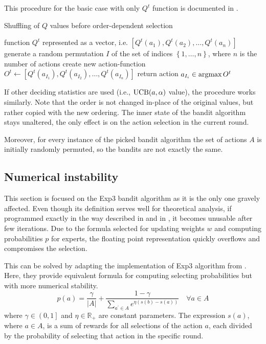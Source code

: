 \documentclass[../main.tex]{subfiles}
\begin{document}
This procedure for the basic case with only $Q^t$ function is documented in .
\begin{algorithm}[ht]
    \caption{Shuffling of $Q$ values before order-dependent selection}
    \label{new:bandit:stochasticity:shuffle}
    \begin{algorithmic}[1]
        \Require function $Q^t$ represented as a vector, i.e. $[Q^t(a_1), Q^t(a_2), \dots, Q^t(a_n)]$
        \State generate a random permutation $I$ of the set of indices $\left\{1, \dots, n\right\}$, where $n$ is the number of actions
        \State create new action-function $O^t \leftarrow [Q^t(a_{I_1}), Q^t(a_{I_2}), \dots, Q^t(a_{I_n})]$
        \State return action $a_{I_i} \in \operatorname*{argmax} O^t$
    \end{algorithmic}
\end{algorithm}
If other deciding statistics are used (i.e., $\text{UCB}(a, \alpha)$ value), the procedure works similarly.
Note that the order is not changed in-place of the original values, but rather copied with the new ordering.
The inner state of the bandit algorithm stays unaltered, the only effect is on the action selection in the current round.

Moreover, for every instance of the picked bandit algorithm the set of actions $A$ is initially randomly permuted, so the bandits are not exactly the same.

\subsection{Numerical instability}\label{new:bandit:instability}
This section is focused on the Exp3 bandit algorithm as it is the only one gravely affected.
Even though its definition serves well for theoretical analysis, if programmed exactly in the way described in  and in \cite{bandits}, it becomes unusable after few iterations.
Due to the formula selected for updating weights $w$ and computing probabilities $p$ for experts, the floating point representation quickly overflows and compromises the selection.

This can be solved by adapting the implementation of Exp3 algorithm from \cite{exp3formula}.
Here, they provide equivalent formula for computing selecting probabilities but with more numerical stability.
\begin{equation}\label{new:bandit:instability:probs}
    p(a) = \frac{\gamma}{|A|} + \frac{1 - \gamma}{\sum_{a^{\prime} \in A} e^{\eta (s(b) - s(a))}}\quad \forall a \in A
\end{equation}
where $\gamma \in \left(0, 1\right]$ and $\eta \in \mathbb{R}_{+}$ are constant parameters.
The expression $s(a)$, where $a \in A$, is a sum of rewards for all selections of the action $a$, each divided by the probability of selecting that action in the specific round.
\end{document}
